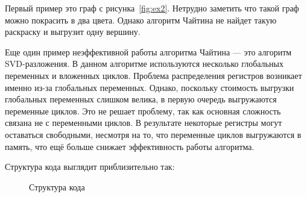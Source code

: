 \documentclass[12pt]{article}
\begin{document}
Первый пример это граф с рисунка~\ref{fig:ex2}. Нетрудно заметить что такой граф можно покрасить в два цвета.
Однако алгоритм Чайтина не найдет такую раскраску и выгрузит одну вершину.

\begin{figure}[H]
    \centering
\end{figure} %

Еще один пример неэффективной работы алгоритма Чайтина — это алгоритм SVD-разложения.
В данном алгоритме используются несколько глобальных переменных и вложенных циклов.
Проблема распределения регистров возникает именно из-за глобальных переменных.  
Однако, поскольку стоимость выгрузки глобальных переменных слишком велика, в первую очередь выгружаются переменные циклов.
Это не решает проблему, так как основная сложность связана не с переменными циклов. 
В результате некоторые регистры могут оставаться свободными, несмотря на то, что переменные циклов выгружаются в память, что ещё больше снижает эффективность работы алгоритма.

Структура кода выглядит приблизительно так:

\begin{figure}[H]
    \centering
    \caption{Структура кода}
    \label{fig:structure}
\end{figure}
\end{document}
